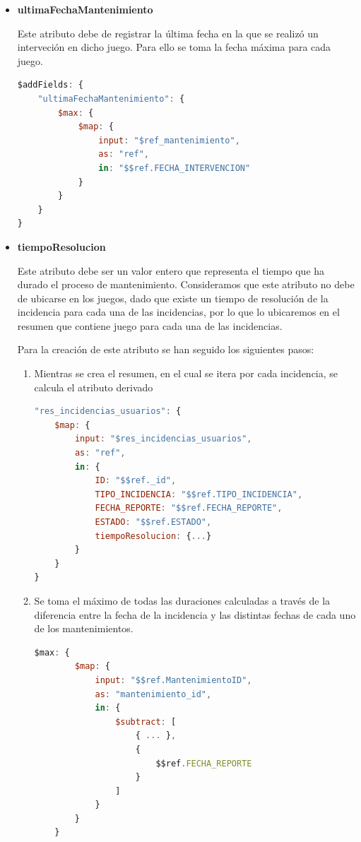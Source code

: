 \documentclass[]{article}
\begin{document}
\begin{itemize}
    \item \textbf{ultimaFechaMantenimiento}
    
    Este atributo debe de registrar la última fecha en la que se realizó un interveción en dicho juego. Para ello se toma la fecha máxima para cada juego.

    \begin{lstlisting}[caption=Cálculo de ultimaFechaMantenimiento, language=JavaScript]
$addFields: {
    "ultimaFechaMantenimiento": {
        $max: {
            $map: {
                input: "$ref_mantenimiento",
                as: "ref",
                in: "$$ref.FECHA_INTERVENCION"
            }
        }
    }
}
    \end{lstlisting}

    \item \textbf{tiempoResolucion}
    
    Este atributo debe ser un valor entero que representa el tiempo que ha durado el proceso de mantenimiento. Consideramos que este atributo no debe de ubicarse en los juegos, dado que existe un tiempo de resolución de la incidencia para cada una de las incidencias, por lo que lo ubicaremos en el resumen que contiene juego para cada una de las incidencias.

    Para la creación de este atributo se han seguido los siguientes pasos:
    \begin{enumerate}
        \item Mientras se crea el resumen, en el cual se itera por cada incidencia, se calcula el atributo derivado
        
        \begin{lstlisting}[caption=Iterar por cada incidencia durante la creación del resumen, language=JavaScript]
"res_incidencias_usuarios": {
    $map: {
        input: "$res_incidencias_usuarios",
        as: "ref",
        in: {
            ID: "$$ref._id",
            TIPO_INCIDENCIA: "$$ref.TIPO_INCIDENCIA",
            FECHA_REPORTE: "$$ref.FECHA_REPORTE",
            ESTADO: "$$ref.ESTADO",
            tiempoResolucion: {...}
        }
    }
}
        \end{lstlisting}

        \item Se toma el máximo de todas las duraciones calculadas a través de la diferencia entre la fecha de la incidencia y las distintas fechas de cada uno de los mantenimientos.
        
        \begin{lstlisting}[language=JavaScript, caption=Máximo de las duraciones calculadas]
$max: {
        $map: {
            input: "$$ref.MantenimientoID",
            as: "mantenimiento_id",
            in: {
                $subtract: [
                    { ... },
                    {
                        $$ref.FECHA_REPORTE
                    }
                ]
            }
        }
    }
        \end{lstlisting}


\end{enumerate}
\end{itemize}
\end{document}
